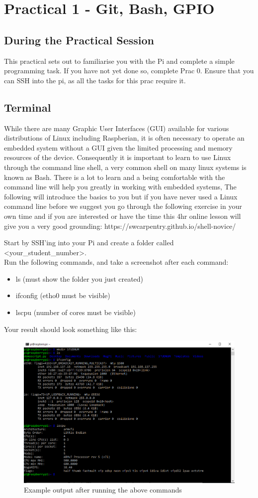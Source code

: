 \section{Practical 1 - Git, Bash, GPIO}
\label{sec:Prac1}
\subsection{During the Practical Session}
This practical sets out to familiarise you with the Pi and complete a simple programming task. If you have not yet done so, complete Prac 0. Ensure that you can SSH into the pi, as all the tasks for this prac require it.


\subsection{Terminal}
\label{sec:Prac1:Terminal}
While there are many Graphic User Interfaces (GUI) available for various distributions of Linux including Raspberian, it is often necessary to operate an embedded system without a GUI given the limited processing and memory resources of the device.  Consequently it is important to learn to use Linux through the command line shell, a very common shell on many linux systems is known as Bash.  There is a lot to learn and a being comfortable with the command line will help you greatly in working with embedded systems,  The following will introduce the basics to you but if you have never used a Linux command line before we suggest you go through the following exercise in your own time  and if you are interested or have the time this 4hr online lesson will give you a very good grounding: https://swcarpentry.github.io/shell-novice/

Start by SSH'ing into your Pi and create a folder called \textless your\_student\_number\textgreater.\\
Run the following commands, and take a screenshot after each command:
\begin{itemize}
    \item ls (must show the folder you just created)
    \item ifconfig (etho0 must be visible)
    \item lscpu (number of cores must be visible)
\end{itemize}
Your result should look something like this:
\begin{figure}[H]
\centering
\includegraphics[width=0.6\columnwidth]{Figures/CMDOutput}
\caption{Example output after running the above commands}
\label{fig:CMDOutput}
\end{figure}



